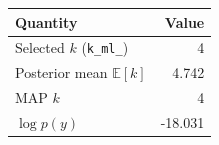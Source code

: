 \begin{tabular}{lr}\toprule
Quantity & Value\\\midrule
Selected $k$ (\texttt{k\_ml\_}) & 4\\
Posterior mean $\mathbb{E}[k]$ & 4.742\\
MAP $k$ & 4\\
$\log p(y)$ & -18.031\\
\bottomrule\end{tabular}
